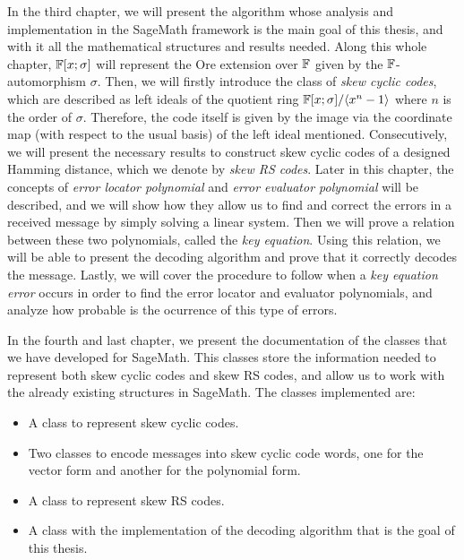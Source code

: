 In the third chapter, we will present the algorithm whose analysis and implementation in the SageMath framework is the main goal of this thesis, and with it all the mathematical structures and results needed. Along this whole chapter, \(\mathbb{F}[x;\sigma]\) will represent the Ore extension over \(\mathbb{F}\) given by the  \(\mathbb{F}\)-automorphism \(\sigma\). Then, we will firstly introduce the class of \textit{skew cyclic codes}, which are described as left ideals of the quotient ring \(\mathbb{F}[x;\sigma] / \langle x^{n} - 1 \rangle\) where \(n\) is the order of \(\sigma\). Therefore, the code itself is given by the image via the coordinate map (with respect to the usual basis) of the left ideal mentioned. Consecutively, we will present the necessary results to construct skew cyclic codes of a designed Hamming distance, which we denote by \textit{skew RS codes}. Later in this chapter, the concepts of \textit{error locator polynomial} and \textit{error evaluator polynomial} will be described, and we will show how they allow us to find and correct the errors in a received message by simply solving a linear system. Then we will prove a relation between these two polynomials, called the \textit{key equation}. Using this relation, we will be able to present the decoding algorithm and prove that it correctly decodes the message. Lastly, we will cover the procedure to follow when a \textit{key equation error} occurs in order to find the error locator and evaluator polynomials, and analyze how probable is the ocurrence of this type of errors.

In the fourth and last chapter, we present the documentation of the classes that we have developed for SageMath. This classes store the information needed to represent both skew cyclic codes and skew RS codes, and allow us to work with the already existing structures in SageMath. The classes implemented are:

\begin{itemize}
    \item A class to represent skew cyclic codes.
    \item Two classes to encode messages into skew cyclic code words, one for the vector form and another for the polynomial form.
    \item A class to represent skew RS codes.
    \item A class with the implementation of the decoding algorithm that is the goal of this thesis.
\end{itemize}

